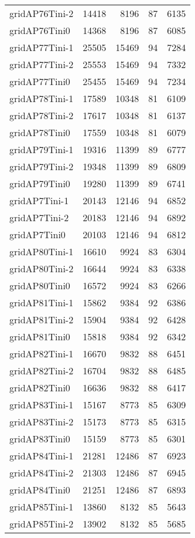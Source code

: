 \documentclass[../../../thesis.tex]{subfiles}
\begin{document}
\begin{longtable}{lrrrr}
gridAP76Tini-2 & 14418 & 8196 & 87 & 6135 \\
gridAP76Tini0 & 14368 & 8196 & 87 & 6085 \\
gridAP77Tini-1 & 25505 & 15469 & 94 & 7284 \\
gridAP77Tini-2 & 25553 & 15469 & 94 & 7332 \\
gridAP77Tini0 & 25455 & 15469 & 94 & 7234 \\
gridAP78Tini-1 & 17589 & 10348 & 81 & 6109 \\
gridAP78Tini-2 & 17617 & 10348 & 81 & 6137 \\
gridAP78Tini0 & 17559 & 10348 & 81 & 6079 \\
gridAP79Tini-1 & 19316 & 11399 & 89 & 6777 \\
gridAP79Tini-2 & 19348 & 11399 & 89 & 6809 \\
gridAP79Tini0 & 19280 & 11399 & 89 & 6741 \\
gridAP7Tini-1 & 20143 & 12146 & 94 & 6852 \\
gridAP7Tini-2 & 20183 & 12146 & 94 & 6892 \\
gridAP7Tini0 & 20103 & 12146 & 94 & 6812 \\
gridAP80Tini-1 & 16610 & 9924 & 83 & 6304 \\
gridAP80Tini-2 & 16644 & 9924 & 83 & 6338 \\
gridAP80Tini0 & 16572 & 9924 & 83 & 6266 \\
gridAP81Tini-1 & 15862 & 9384 & 92 & 6386 \\
gridAP81Tini-2 & 15904 & 9384 & 92 & 6428 \\
gridAP81Tini0 & 15818 & 9384 & 92 & 6342 \\
gridAP82Tini-1 & 16670 & 9832 & 88 & 6451 \\
gridAP82Tini-2 & 16704 & 9832 & 88 & 6485 \\
gridAP82Tini0 & 16636 & 9832 & 88 & 6417 \\
gridAP83Tini-1 & 15167 & 8773 & 85 & 6309 \\
gridAP83Tini-2 & 15173 & 8773 & 85 & 6315 \\
gridAP83Tini0 & 15159 & 8773 & 85 & 6301 \\
gridAP84Tini-1 & 21281 & 12486 & 87 & 6923 \\
gridAP84Tini-2 & 21303 & 12486 & 87 & 6945 \\
gridAP84Tini0 & 21251 & 12486 & 87 & 6893 \\
gridAP85Tini-1 & 13860 & 8132 & 85 & 5643 \\
gridAP85Tini-2 & 13902 & 8132 & 85 & 5685 \\

\end{longtable}
\end{document}
